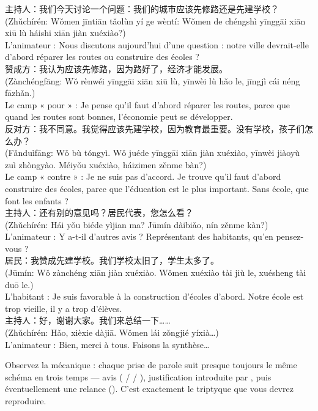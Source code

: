 \documentclass[11pt]{article}
\newcommand{\cle}[1]{{\popxbold\color{popdark}#1}}
\newcommand{\zh}[1]{\ifmmode\text{#1}\else{#1}\fi}
\begin{document}
\begin{textebox}
主持人：我们今天讨论一个问题：我们的城市应该先修路还是先建学校？\\
(Zhǔchírén: Wǒmen jīntiān tǎolùn yí ge wèntí: Wǒmen de chéngshì yīnggāi xiān xiū lù háishi xiān jiàn xuéxiào?)\\
L'animateur : Nous discutons aujourd'hui d'une question : notre ville devrait-elle d'abord réparer les routes ou construire des écoles ?\\[4pt]
赞成方：我认为应该先修路，因为路好了，经济才能发展。\\
(Zànchéngfāng: Wǒ rènwéi yīnggāi xiān xiū lù, yīnwèi lù hǎo le, jīngjì cái néng fāzhǎn.)\\
Le camp « pour » : Je pense qu'il faut d'abord réparer les routes, parce que quand les routes sont bonnes, l'économie peut se développer.\\[4pt]
反对方：我不同意。我觉得应该先建学校，因为教育最重要。没有学校，孩子们怎么办？\\
(Fǎnduìfāng: Wǒ bù tóngyì. Wǒ juéde yīnggāi xiān jiàn xuéxiào, yīnwèi jiàoyù zuì zhòngyào. Méiyǒu xuéxiào, háizimen zěnme bàn?)\\
Le camp « contre » : Je ne suis pas d'accord. Je trouve qu'il faut d'abord construire des écoles, parce que l'éducation est le plus important. Sans école, que font les enfants ?\\[4pt]
主持人：还有别的意见吗？居民代表，您怎么看？\\
(Zhǔchírén: Hái yǒu biéde yìjian ma? Jūmín dàibiǎo, nín zěnme kàn?)\\
L'animateur : Y a-t-il d'autres avis ? Représentant des habitants, qu'en pensez-vous ?\\[4pt]
居民：我赞成先建学校。我们学校太旧了，学生太多了。\\
(Jūmín: Wǒ zànchéng xiān jiàn xuéxiào. Wǒmen xuéxiào tài jiù le, xuésheng tài duō le.)\\
L'habitant : Je suis favorable à la construction d'écoles d'abord. Notre école est trop vieille, il y a trop d'élèves.\\[4pt]
主持人：好，谢谢大家。我们来总结一下……\\
(Zhǔchírén: Hǎo, xièxie dàjiā. Wǒmen lái zǒngjié yíxià…)\\
L'animateur : Bien, merci à tous. Faisons la synthèse…
\end{textebox}

Observez la mécanique : chaque prise de parole suit presque toujours le même schéma en trois temps — \cle{avis} (\zh{我认为} / \zh{我赞成} / \zh{我不同意}), \cle{justification} introduite par \zh{因为}, puis éventuellement une \cle{relance} (\zh{您怎么看？}). C'est exactement le triptyque que vous devrez reproduire.
\end{document}
